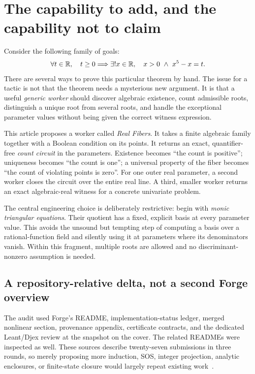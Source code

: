 \section{The capability to add, and the capability not to claim}

Consider the following family of goals:
\begin{equation}\label{eq:opening}
\forall t\in\mathbb R,\quad t\geq 0\Longrightarrow
\exists!x\in\mathbb R,\quad x>0\ \wedge\ x^5-x=t.
\end{equation}
There are several ways to prove this particular theorem by hand. The issue for a tactic is not that the theorem needs a mysterious new argument. It is that a useful \emph{generic worker} should discover algebraic existence, count admissible roots, distinguish a unique root from several roots, and handle the exceptional parameter values without being given the correct witness expression.

This article proposes a worker called \emph{Real Fibers}. It takes a finite algebraic family together with a Boolean condition on its points. It returns an exact, quantifier-free \emph{count circuit} in the parameters. Existence becomes ``the count is positive''; uniqueness becomes ``the count is one''; a universal property of the fiber becomes ``the count of violating points is zero''. For one outer real parameter, a second worker closes the circuit over the entire real line. A third, smaller worker returns an exact algebraic-real witness for a concrete univariate problem.

The central engineering choice is deliberately restrictive: begin with \emph{monic triangular equations}. Their quotient has a fixed, explicit basis at every parameter value. This avoids the unsound but tempting step of computing a basis over a rational-function field and silently using it at parameters where its denominators vanish. Within this fragment, multiple roots are allowed and no discriminant-nonzero assumption is needed.

\subsection{A repository-relative delta, not a second Forge overview}

The audit used Forge's README, implementation-status ledger, merged nonlinear section, provenance appendix, certificate contracts, and the dedicated Leant/Djex review at the snapshot on the cover. The related READMEs were inspected as well. These sources describe twenty-seven submissions in three rounds, so merely proposing more induction, SOS, integer projection, analytic enclosures, or finite-state closure would largely repeat existing work~\cite{forge,leant,djex}.

